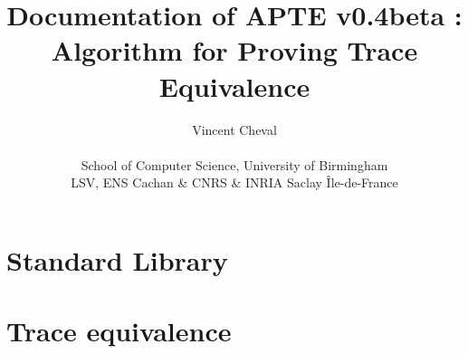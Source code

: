 \documentclass[a4paper,10pt]{book}
\title{Documentation of APTE v0.4beta : Algorithm for Proving Trace Equivalence}
\author{Vincent Cheval
\\
\\
School of Computer Science, University of Birmingham\\
LSV, ENS Cachan \& CNRS \& INRIA Saclay \^Ile-de-France}
\begin{document}
\maketitle

\tableofcontents

\chapter{Standard Library}


\chapter{Trace equivalence}




\end{document}
